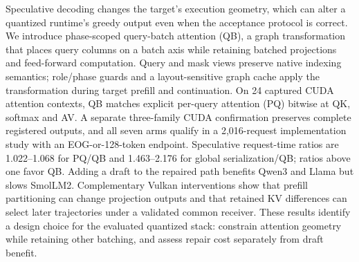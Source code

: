 Speculative decoding changes the target's execution geometry, which can alter a quantized runtime's greedy output even when the acceptance protocol is correct. We introduce phase-scoped query-batch attention (QB), a graph transformation that places query columns on a batch axis while retaining batched projections and feed-forward computation. Query and mask views preserve native indexing semantics; role/phase guards and a layout-sensitive graph cache apply the transformation during target prefill and continuation. On 24 captured CUDA attention contexts, QB matches explicit per-query attention (PQ) bitwise at QK, softmax and AV. A separate three-family CUDA confirmation preserves complete registered outputs, and all seven arms qualify in a 2,016-request implementation study with an EOG-or-128-token endpoint. Speculative request-time ratios are 1.022--1.068 for PQ/QB and 1.463--2.176 for global serialization/QB; ratios above one favor QB. Adding a draft to the repaired path benefits Qwen3 and Llama but slows SmolLM2. Complementary Vulkan interventions show that prefill partitioning can change projection outputs and that retained KV differences can select later trajectories under a validated common receiver. These results identify a design choice for the evaluated quantized stack: constrain attention geometry while retaining other batching, and assess repair cost separately from draft benefit.
